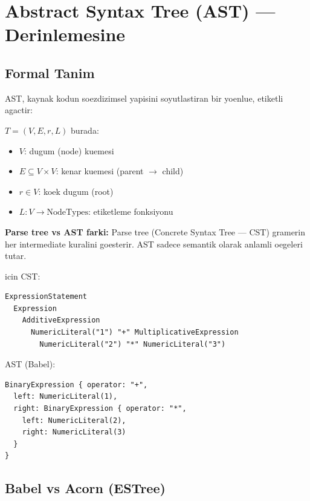 
\section{Abstract Syntax Tree (AST) --- Derinlemesine}
\label{sec:ast-deep}

\subsection{Formal Tanim}

AST, kaynak kodun soezdizimsel yapisini soyutlastiran bir yoenlue, etiketli agactir:

\begin{definition}
$T = (V, E, r, L)$ burada:
\begin{itemize}
\item $V$: dugum (node) kuemesi
\item $E \subseteq V \times V$: kenar kuemesi (parent $\to$ child)
\item $r \in V$: koek dugum (root)
\item $L: V \to \text{NodeTypes}$: etiketleme fonksiyonu
\end{itemize}
\end{definition}

\textbf{Parse tree vs AST farki:} Parse tree (Concrete Syntax Tree --- CST) gramerin her intermediate kuralini goesterir. AST sadece semantik olarak anlamli oegeleri tutar.

\begin{example}
 icin CST:
\begin{lstlisting}
ExpressionStatement
  Expression
    AdditiveExpression
      NumericLiteral("1") "+" MultiplicativeExpression
        NumericLiteral("2") "*" NumericLiteral("3")
\end{lstlisting}

AST (Babel):
\begin{lstlisting}
BinaryExpression { operator: "+",
  left: NumericLiteral(1),
  right: BinaryExpression { operator: "*",
    left: NumericLiteral(2),
    right: NumericLiteral(3)
  }
}
\end{lstlisting}
\end{example}

\subsection{Babel vs Acorn (ESTree)}

